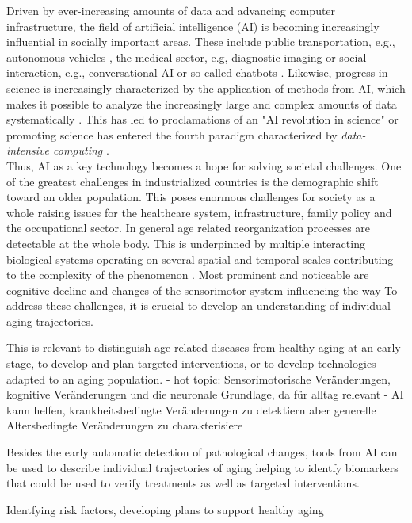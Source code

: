 Driven by ever-increasing amounts of data and advancing computer infrastructure, the field of artificial intelligence (AI) is becoming increasingly influential in socially important areas. These include public transportation, e.g., autonomous vehicles \cite{Leonard2020}, the medical sector, e.g, diagnostic imaging \cite{Liu2020} or social interaction, e.g., conversational AI or so-called chatbots \cite{Adamopoulou2020}. Likewise, progress in science is increasingly characterized by the application of methods from AI, which makes it possible to analyze the increasingly large and complex amounts of data systematically \cite{Brunton2019}. This has led to proclamations of an "AI revolution in science" \cite{Appenzeller2017} or promoting science has entered the fourth paradigm characterized by \textit{data-intensive computing} \cite{Hey2009}.\\
Thus, AI as a key technology becomes a hope for solving societal challenges. One of the greatest challenges in industrialized countries is the demographic shift toward an older population. This poses enormous challenges for society as a whole raising issues for the healthcare system, infrastructure, family policy and the occupational sector. In general age related reorganization processes are detectable at the whole body. This is underpinned by multiple interacting biological systems operating on several spatial and temporal scales contributing to the complexity of the phenomenon \cite{Mooney2016}. Most prominent and noticeable are cognitive decline and changes of the sensorimotor system influencing the way 
To address these challenges, it is crucial to develop an understanding of individual aging trajectories. 

This is relevant to distinguish age-related diseases from healthy aging at an early stage, to develop and plan targeted interventions, or to develop technologies adapted to an aging population. 
- hot topic: Sensorimotorische Veränderungen, kognitive Veränderungen und die neuronale Grundlage, da für alltag relevant 
- AI kann helfen, krankheitsbedingte Veränderungen zu detektiern aber generelle Altersbedingte Veränderungen zu charakterisiere 

Besides the early automatic detection of pathological changes, tools from AI can be used to describe individual trajectories of aging helping to identfy biomarkers that could be used to verify treatments as well as targeted interventions.



Identfying risk factors, developing plans to support healthy aging 

